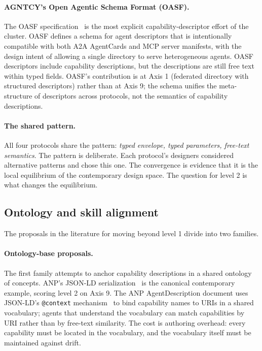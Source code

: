 \paragraph{AGNTCY's Open Agentic Schema Format (OASF).}
The OASF specification~\cite{spec_agntcy} is the most
explicit capability-descriptor effort of the cluster. OASF
defines a schema for agent descriptors that is
intentionally compatible with both A2A AgentCards and MCP
server manifests, with the design intent of allowing a
single directory to serve heterogeneous agents. OASF
descriptors include capability descriptions, but the
descriptions are still free text within typed fields.
OASF's contribution is at Axis 1 (federated directory
with structured descriptors) rather than at Axis 9; the
schema unifies the meta-structure of descriptors across
protocols, not the semantics of capability descriptions.

\paragraph{The shared pattern.}
All four protocols share the pattern: \emph{typed envelope,
typed parameters, free-text semantics}. The pattern is
deliberate. Each protocol's designers considered
alternative patterns and chose this one. The
convergence is evidence that it is the local equilibrium of
the contemporary design space. The question for level 2 is
what changes the equilibrium.

\subsection{Ontology and skill alignment}
\label{sec:semantic:ontology}

The proposals in the literature for moving beyond level 1
divide into two families.

\paragraph{Ontology-base proposals.}
The first family attempts to anchor capability descriptions
in a shared ontology of concepts. ANP's JSON-LD
serialization~\cite{spec_anp} is the canonical contemporary
example, scoring level 2 on Axis 9. The ANP AgentDescription
document uses JSON-LD's
\texttt{@context} mechanism~\cite{w3c_json_ld} to bind
capability names to URIs in a shared vocabulary; agents
that understand the
vocabulary can match capabilities by URI rather than by
free-text similarity. The cost is authoring overhead: every
capability must be located in the vocabulary, and the
vocabulary itself must be maintained against drift.

